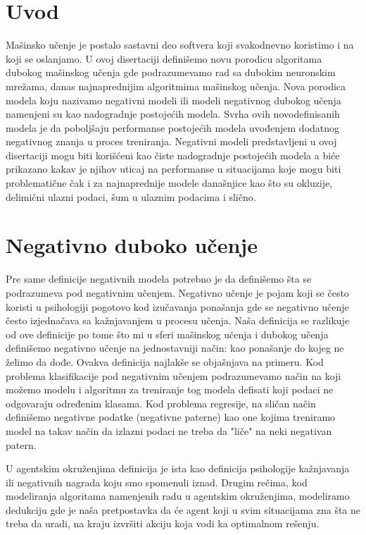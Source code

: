 \section*{Uvod}

Mašinsko učenje je postalo sastavni deo softvera koji svakodnevno koristimo i na koji se oslanjamo. U ovoj disertaciji definišemo novu porodicu algoritama dubokog mašinskog učenja gde podrazumevamo rad sa dubokim neuronskim mrežama, danas najnaprednijim algoritmima mašinskog učenja. Nova porodica modela koju nazivamo negativni modeli ili modeli negativnog dubokog učenja namenjeni su kao nadogradnje postojećih modela. Svrha ovih novodefinisanih modela je da poboljšaju performanse postojećih modela uvođenjem dodatnog negativnog znanja u proces treniranja. Negativni modeli predstavljeni u ovoj disertaciji mogu biti korišćeni kao čiste nadogradnje postojećih modela a biće prikazano kakav je njihov uticaj na performanse u situacijama koje mogu biti problematične čak i za najnaprednije modele današnjice kao što su okluzije, delimični ulazni podaci, šum u ulaznim podacima i slično.

\section*{Negativno duboko učenje}

Pre same definicije negativnih modela potrebno je da definišemo šta se podrazumeva pod negativnim učenjem. Negativno učenje je pojam koji se često koristi u psihologiji pogotovo kod izučavanja ponašanja gde se negativno učenje često izjednačava sa kažnjavanjem u procesu učenja. \cite{mcleod2007bf,staddon2003operant} Naša definicija se razlikuje od ove definicije po tome što mi u sferi mašinskog učenja i dubokog učenja definišemo negativno učenje na jednostavniji način: kao ponašanje do kojeg ne želimo da dođe. Ovakva definicija najlakše se objašnjava na primeru. Kod problema klasifikacije pod negativnim učenjem podrazumevamo način na koji možemo modelu i algoritmu za treniranje tog modela defisati koji podaci ne odgovaraju određenim klasama. Kod problema regresije, na sličan način definišemo negativne podatke (negativne paterne) kao one kojima treniramo model na takav način da izlazni podaci ne treba da "liče" na neki negativan patern. 

U agentskim okruženjima definicija je ista kao definicija psihologije kažnjavanja ili negativnih nagrada koju smo spomenuli iznad. Drugim rečima, kod modeliranja algoritama namenjenih radu u agentskim okruženjima, modeliramo dedukciju gde je naša pretpostavka da će agent koji u svim situacijama zna šta ne treba da uradi, na kraju izvršiti akciju koja vodi ka optimalnom rešenju.

